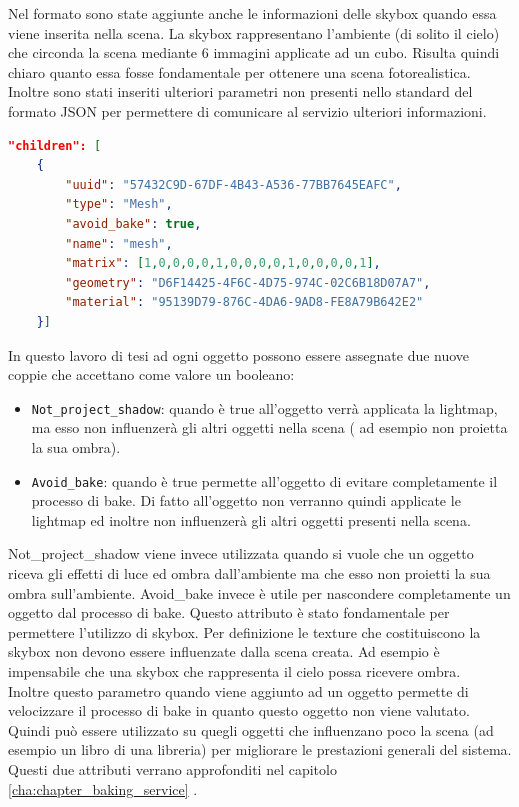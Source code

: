 Nel formato sono state aggiunte anche le informazioni delle skybox quando essa viene inserita nella scena. La skybox rappresentano l’ambiente (di solito il cielo) che circonda la scena mediante 6 immagini applicate ad un cubo. Risulta quindi chiaro quanto essa fosse fondamentale per ottenere una scena fotorealistica.
Inoltre sono stati inseriti ulteriori parametri non presenti nello standard del formato JSON per permettere di comunicare al servizio ulteriori informazioni.

\begin{lstlisting}[language=json]
"children": [
    {
        "uuid": "57432C9D-67DF-4B43-A536-77BB7645EAFC",
        "type": "Mesh",
        "avoid_bake": true,
        "name": "mesh",
        "matrix": [1,0,0,0,0,1,0,0,0,0,1,0,0,0,0,1],
        "geometry": "D6F14425-4F6C-4D75-974C-02C6B18D07A7",
        "material": "95139D79-876C-4DA6-9AD8-FE8A79B642E2"
    }]
\end{lstlisting}
In questo lavoro di tesi ad ogni oggetto possono essere assegnate due nuove coppie che accettano come valore un booleano:

\begin{itemize}
\item \texttt{Not\_project\_shadow}: quando è true all’oggetto verrà applicata la lightmap, ma esso non influenzerà gli altri oggetti nella scena ( ad esempio non proietta la sua ombra).
\item \texttt{Avoid\_bake}: quando è true permette all’oggetto di evitare completamente il processo di bake. Di fatto all’oggetto non verranno quindi applicate le lightmap ed inoltre non influenzerà gli altri oggetti presenti nella scena.
\end{itemize}
Not\_project\_shadow viene invece utilizzata quando si vuole che un oggetto riceva gli effetti di luce ed ombra dall’ambiente ma che esso non proietti la sua ombra sull’ambiente.
Avoid\_bake invece è utile per nascondere completamente un oggetto dal processo di bake. Questo attributo è stato fondamentale per permettere l’utilizzo di skybox. Per definizione le texture che costituiscono la skybox non devono essere influenzate dalla scena creata. Ad esempio è impensabile che una skybox che rappresenta il cielo possa ricevere ombra.
\\
Inoltre questo parametro quando viene aggiunto ad un oggetto permette di velocizzare il processo di bake in quanto questo oggetto non viene valutato. Quindi può essere utilizzato su quegli oggetti che influenzano poco la scena (ad esempio un libro di una libreria) per migliorare le prestazioni generali del sistema. Questi due attributi verrano approfonditi nel capitolo \ref{cha:chapter_baking_service} .
